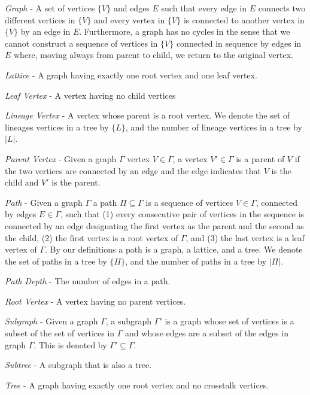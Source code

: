 \documentclass{article}
\begin{document}
\noindent\textit{Graph} - A set of vertices $\{V\}$ and edges $E$ such that every edge in $E$ connects two different vertices in $\{V\}$ and every vertex in $\{V\}$ is connected to another vertex in $\{V\}$ by an edge in $E$. Furthermore, a graph has no cycles in the sense that we cannot construct a sequence of vertices in $\{V\}$ connected in sequence by edges in $E$ where, moving always from parent to child, we return to the original vertex.

\noindent\textit{Lattice} - A graph having exactly one root vertex and one leaf vertex.

\noindent\textit{Leaf Vertex} - A vertex having no child vertices

\noindent\textit{Lineage Vertex} - A vertex whose parent is a root vertex. We denote the set of lineages vertices in a tree by $\{L\}$, and the number of lineage vertices in a tree by $|L|$.

\noindent\textit{Parent Vertex} - Given a graph $\Gamma$ vertex $V \in \Gamma$, a vertex $V' \in \Gamma$ is a parent of $V$ if the two vertices are connected by an edge and the edge indicates that $V$ is the child and $V'$ is the parent.

\noindent\textit{Path} - Given a graph $\Gamma$ a path $\Pi \subseteq \Gamma$ is a sequence of vertices $V \in \Gamma$, connected by edges $E \in \Gamma$, such that (1) every consecutive pair of vertices in the sequence is connected by an edge designating the first vertex as the parent and the second as the child, (2) the first vertex is a root vertex of $\Gamma$, and (3) the last vertex is a leaf vertex of $\Gamma$. By our definitions a path is a graph, a lattice, and a tree. We denote the set of paths in a tree by $\{\Pi\}$, and the number of paths in a tree by $|\Pi|$.

\noindent\textit{Path Depth} - The number of edges in a path.

\noindent\textit{Root Vertex} - A vertex having no parent vertices.

\noindent\textit{Subgraph} - Given a graph $\Gamma$, a subgraph $\Gamma'$ is a graph whose set of vertices is a subset of the set of vertices in $\Gamma$ and whose edges are a subset of the edges in graph $\Gamma$. This is denoted by $\Gamma' \subseteq \Gamma$.

\noindent\textit{Subtree} - A subgraph that is also a tree.

\noindent\textit{Tree} - A graph having exactly one root vertex and no crosstalk vertices.
\end{document}
